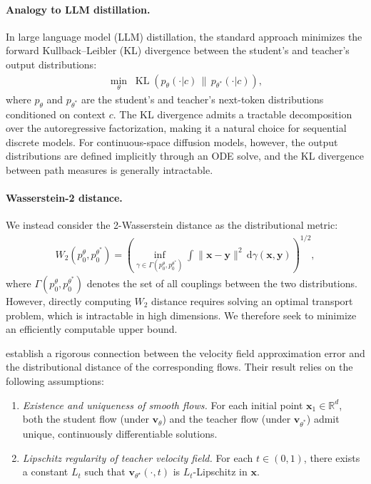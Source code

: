 \documentclass{llmxive}
\providecommand{\bm}[1]{\boldsymbol{#1}}
\providecommand{\mathbf}[1]{\bm{#1}}
\begin{document}
\paragraph{Analogy to LLM distillation.} In large language model (LLM) distillation, the standard approach minimizes the forward Kullback--Leibler (KL) divergence between the student's and teacher's output distributions:
\begin{align}
    \min_\theta \; \operatorname{KL}\!\left(p_\theta(\cdot | c) \,\|\, p_{\theta^*}(\cdot | c)\right),
\end{align}
where $p_\theta$ and $p_{\theta^*}$ are the student's and teacher's next-token distributions conditioned on context $c$. The KL divergence admits a tractable decomposition over the autoregressive factorization, making it a natural choice for sequential discrete models. For continuous-space diffusion models, however, the output distributions are defined implicitly through an ODE solve, and the KL divergence between path measures is generally intractable.

\paragraph{Wasserstein-2 distance.} We instead consider the 2-Wasserstein distance as the distributional metric:
\begin{align}
    W_2(p_0^\theta, p_0^{\theta^*}) = \left(\inf_{\gamma \in \Gamma(p_0^\theta, p_0^{\theta^*})} \int \|\mathbf{x} - \mathbf{y}\|^2 \,\mathrm{d}\gamma(\mathbf{x}, \mathbf{y})\right)^{1/2},
\end{align}
where $\Gamma(p_0^\theta, p_0^{\theta^*})$ denotes the set of all couplings between the two distributions. However, directly computing $W_2$ distance requires solving an optimal transport problem, which is intractable in high dimensions. We therefore seek to minimize an efficiently computable upper bound.

\citet{benton2023error} establish a rigorous connection between the velocity field approximation error and the distributional distance of the corresponding flows. Their result relies on the following assumptions:

\begin{enumerate}[leftmargin=*, itemsep=2pt, label=\textbf{(A\arabic*)}]
    \item \emph{Existence and uniqueness of smooth flows.} For each initial point $\mathbf{x}_1 \in \mathbb{R}^d$, both the student flow (under $\mathbf{v}_\theta$) and the teacher flow (under $\mathbf{v}_{\theta^*}$) admit unique, continuously differentiable solutions.
    \item \emph{Lipschitz regularity of teacher velocity field.} For each $t \in (0, 1)$, there exists a constant $L_t$ such that $\mathbf{v}_{\theta^\star}(\cdot, t)$ is $L_t$-Lipschitz in $\mathbf{x}$.
\end{enumerate}
\end{document}

